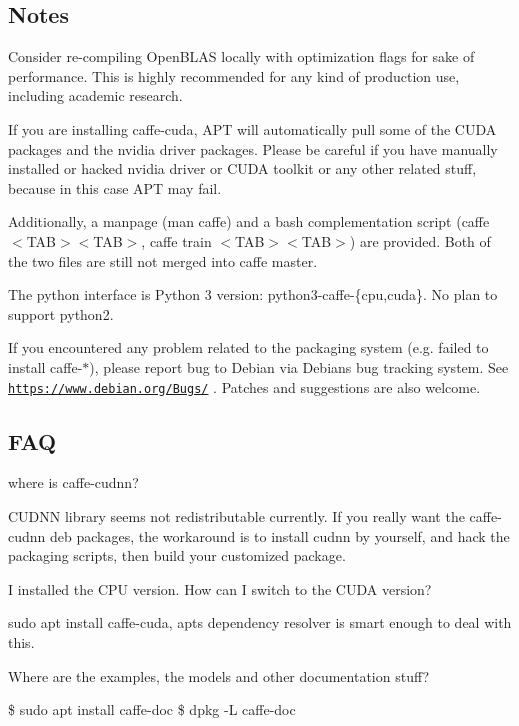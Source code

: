 \subsection*{Notes}


\begin{DoxyItemize}
\item Consider re-\/compiling Open\+B\+L\+AS locally with optimization flags for sake of performance. This is highly recommended for any kind of production use, including academic research.
\item If you are installing {\ttfamily caffe-\/cuda}, A\+PT will automatically pull some of the C\+U\+DA packages and the nvidia driver packages. Please be careful if you have manually installed or hacked nvidia driver or C\+U\+DA toolkit or any other related stuff, because in this case A\+PT may fail.
\item Additionally, a manpage ({\ttfamily man caffe}) and a bash complementation script ({\ttfamily caffe $<$T\+AB$>$$<$T\+AB$>$}, {\ttfamily caffe train $<$T\+AB$>$$<$T\+AB$>$}) are provided. Both of the two files are still not merged into caffe master.
\item The python interface is Python 3 version\+: {\ttfamily python3-\/caffe-\/\{cpu,cuda\}}. No plan to support python2.
\item If you encountered any problem related to the packaging system (e.\+g. failed to install {\ttfamily caffe-\/$\ast$}), please report bug to Debian via Debian\textquotesingle{}s bug tracking system. See \href{https://www.debian.org/Bugs/}{\tt https\+://www.\+debian.\+org/\+Bugs/} . Patches and suggestions are also welcome.
\end{DoxyItemize}

\subsection*{F\+AQ}


\begin{DoxyItemize}
\item where is caffe-\/cudnn?
\end{DoxyItemize}

C\+U\+D\+NN library seems not redistributable currently. If you really want the caffe-\/cudnn deb packages, the workaround is to install cudnn by yourself, and hack the packaging scripts, then build your customized package.


\begin{DoxyItemize}
\item I installed the C\+PU version. How can I switch to the C\+U\+DA version?
\end{DoxyItemize}

{\ttfamily sudo apt install caffe-\/cuda}, apt\textquotesingle{}s dependency resolver is smart enough to deal with this.


\begin{DoxyItemize}
\item Where are the examples, the models and other documentation stuff?
\end{DoxyItemize}


\begin{DoxyCode}
\$ sudo apt install caffe-doc
\$ dpkg -L caffe-doc
\end{DoxyCode}
 